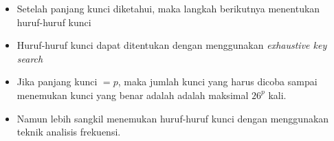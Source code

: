 \documentclass{article}
\begin{document}

\begin{itemize}
    \item Setelah panjang kunci diketahui, maka langkah berikutnya menentukan huruf-huruf kunci
    \item Huruf-huruf kunci dapat ditentukan dengan menggunakan \textit{exhaustive key search}
    \item Jika panjang kunci $= p$, maka jumlah kunci yang harus dicoba sampai menemukan kunci yang benar adalah adalah maksimal $26^p$ kali.
    \item Namun lebih sangkil menemukan huruf-huruf kunci dengan menggunakan teknik analisis frekuensi.
\end{itemize}
\end{document}
